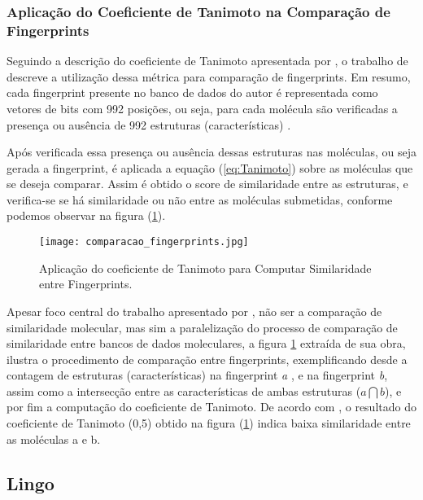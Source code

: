 \subsubsection{Aplicação do Coeficiente de Tanimoto na Comparação de Fingerprints} 

Seguindo a descrição do coeficiente de Tanimoto apresentada por \cite{Dogra2007}, o trabalho de \cite{machao2011gpu} descreve a utilização dessa métrica para comparação de fingerprints. Em resumo, cada fingerprint presente no banco de dados do autor é representada como vetores de bits com 992 posições, ou seja, para cada molécula são 
verificadas a presença ou ausência de 992 estruturas (características) \cite{Dogra2007}. 

Após verificada essa presença ou ausência dessas estruturas nas moléculas, ou seja gerada a 
fingerprint, é aplicada a equação (\ref{eq:Tanimoto}) sobre as moléculas que se deseja comparar. Assim é obtido o score de similaridade entre as estruturas, e verifica-se se há similaridade ou não entre as moléculas submetidas, conforme podemos observar na  figura (\ref{fig:comparafingerprint}).
\begin{figure}[!htb]
	\centering
	\caption[Cálculo do Coeficiente de Tanimoto sobre duas Fingerprints]{Aplicação do coeficiente de Tanimoto para Computar Similaridade entre Fingerprints.}
	\texttt{[image: comparacao\_fingerprints.jpg]} %
	\label{fig:comparafingerprint}
\end{figure}

Apesar foco central do trabalho apresentado por \cite{machao2011gpu}, não ser a comparação de similaridade molecular, mas sim a paralelização do processo de comparação de similaridade entre bancos de dados moleculares, a figura \ref{fig:comparafingerprint} extraída de sua 
obra, ilustra o procedimento de comparação entre fingerprints, exemplificando desde a 
contagem de estruturas (características) na fingerprint \textit{a} , e na fingerprint \textit{b}, assim como a intersecção entre as características de ambas estruturas ($a\bigcap b$), e por fim a computação do coeficiente de Tanimoto. De acordo com \cite{Dogra2007}, o resultado do coeficiente de Tanimoto (0,5) obtido na figura (\ref{fig:comparafingerprint})  indica baixa similaridade entre as moléculas a e b.

\subsection{Lingo}

